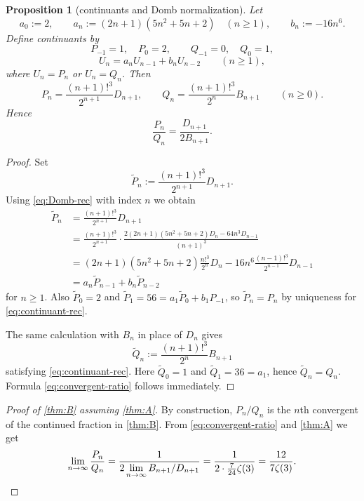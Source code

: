 \documentclass[11pt]{amsart}
\newtheorem{proposition}[theorem]{Proposition}
\theoremstyle{definition}
\theoremstyle{remark}
\begin{document}
\begin{proposition}[continuants and Domb normalization]\label{prop:continuants}
Let
\[
a_0:=2,
\qquad a_n:=(2n+1)(5n^2+5n+2)
\quad(n\ge 1),
\qquad b_n:=-16n^6.
\]
Define continuants by
\[
P_{-1}=1,\quad P_0=2,\qquad Q_{-1}=0,\quad Q_0=1,
\]
\begin{equation}\label{eq:continuant-rec}
U_n=a_nU_{n-1}+b_nU_{n-2}\qquad(n\ge 1),
\end{equation}
where $U_n=P_n$ or $U_n=Q_n$. Then
\begin{equation}\label{eq:continuants-Domb}
P_n=\frac{(n+1)!^3}{2^{n+1}}D_{n+1},
\qquad
Q_n=\frac{(n+1)!^3}{2^n}B_{n+1}
\qquad(n\ge 0).
\end{equation}
Hence
\begin{equation}\label{eq:convergent-ratio}
\frac{P_n}{Q_n}=\frac{D_{n+1}}{2B_{n+1}}.
\end{equation}
\end{proposition}

\begin{proof}
Set
\[
\widetilde P_n:=\frac{(n+1)!^3}{2^{n+1}}D_{n+1}.
\]
Using \eqref{eq:Domb-rec} with index $n$ we obtain
\begin{align*}
\widetilde P_n
&=\frac{(n+1)!^3}{2^{n+1}}D_{n+1}\\
&=\frac{(n+1)!^3}{2^{n+1}}\cdot \frac{2(2n+1)(5n^2+5n+2)D_n-64n^3D_{n-1}}{(n+1)^3}\\
&=(2n+1)(5n^2+5n+2)\frac{n!^3}{2^n}D_n-16n^6\frac{(n-1)!^3}{2^{n-1}}D_{n-1}\\
&=a_n\widetilde P_{n-1}+b_n\widetilde P_{n-2}
\end{align*}
for $n\ge 1$. Also $\widetilde P_0=2$ and $\widetilde P_1=56=a_1\widetilde P_0+b_1P_{-1}$, so $\widetilde P_n=P_n$ by uniqueness for \eqref{eq:continuant-rec}.

The same calculation with $B_n$ in place of $D_n$ gives
\[
\widetilde Q_n:=\frac{(n+1)!^3}{2^n}B_{n+1}
\]
satisfying \eqref{eq:continuant-rec}. Here $\widetilde Q_0=1$ and $\widetilde Q_1=36=a_1$, hence $\widetilde Q_n=Q_n$. Formula \eqref{eq:convergent-ratio} follows immediately.
\end{proof}

\begin{proof}[Proof of \cref{thm:B} assuming \cref{thm:A}]
By construction, $P_n/Q_n$ is the $n$th convergent of the continued fraction in \cref{thm:B}. From \eqref{eq:convergent-ratio} and \cref{thm:A} we get
\[
\lim_{n\to\infty}\frac{P_n}{Q_n}
=\frac{1}{2\lim\limits_{n\to\infty}B_{n+1}/D_{n+1}}
=\frac{1}{2\cdot \frac{7}{24}\zeta(3)}
=\frac{12}{7\zeta(3)}.
\qedhere
\]
\end{proof}
\end{document}
